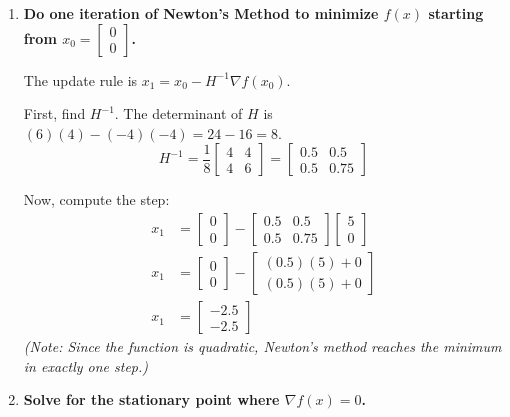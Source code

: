 \documentclass[12pt]{exam}
\begin{document}
\begin{questions}
\begin{enumerate}
                \item \textbf{Do one iteration of Newton’s Method to minimize $f(x)$ starting from $x_0 = \begin{bmatrix} 0 \\ 0 \end{bmatrix}$.}
            
                The update rule is $x_{1} = x_{0} - H^{-1}\nabla f(x_{0})$.
            
                First, find $H^{-1}$. The determinant of $H$ is $(6)(4) - (-4)(-4) = 24 - 16 = 8$.
                \[ H^{-1} = \frac{1}{8} \begin{bmatrix} 4 & 4 \\ 4 & 6 \end{bmatrix} = \begin{bmatrix} 0.5 & 0.5 \\ 0.5 & 0.75 \end{bmatrix} \]
            
                Now, compute the step:
                \begin{align*}
                    x_{1} &= \begin{bmatrix} 0 \\ 0 \end{bmatrix} - \begin{bmatrix} 0.5 & 0.5 \\ 0.5 & 0.75 \end{bmatrix} \begin{bmatrix} 5 \\ 0 \end{bmatrix} \\
                    x_{1} &= \begin{bmatrix} 0 \\ 0 \end{bmatrix} - \begin{bmatrix} (0.5)(5) + 0 \\ (0.5)(5) + 0 \end{bmatrix} \\
                    x_{1} &= \begin{bmatrix} -2.5 \\ -2.5 \end{bmatrix}
                \end{align*}
                \textit{(Note: Since the function is quadratic, Newton's method reaches the minimum in exactly one step.)}
            
                \item \textbf{Solve for the stationary point where $\nabla f(x) = 0$.}
            

\end{enumerate}
\end{questions}
\end{document}
